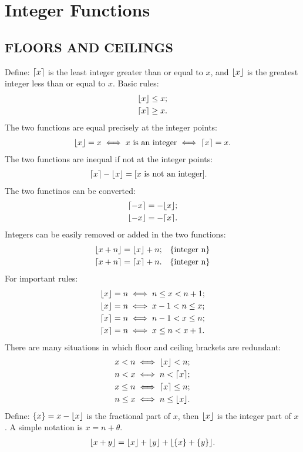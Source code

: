 \documentclass{article}
\DeclarePairedDelimiter\ceil{\lceil}{\rceil}
\DeclarePairedDelimiter\floor{\lfloor}{\rfloor}
\begin{document}
\setcounter{section}{2}
\section{Integer Functions}
\subsection{FLOORS AND CEILINGS}
Define: $\ceil{x}$ is the least integer greater than or equal to $x$, and $\floor{x}$ is the greatest integer less than or equal to $x$.
Basic rules:
\begin{align}
\floor{x} &\le x; \\
\ceil{x} &\ge x.
\end{align}
The two functions are equal precisely at the integer points:
\begin{align}
\floor{x} = x \iff x \text{ is an integer} \iff \ceil{x} = x.
\end{align}
The two functions are inequal if not at the integer points:
\begin{align}
\ceil{x} - \floor{x} &= [x \text{ is not an integer}].
\end{align}
The two functinos can be converted:
\begin{align}
\ceil{-x} &= -\floor{x}; \\
\floor{-x} &= -\ceil{x}.
\end{align}
Integers can be easily removed or added in the two functions:
\begin{align}
\floor{x + n} &= \floor{x} + n; && \{\text{integer n}\} \\
\ceil{x + n} &= \ceil{x} + n. && \{\text{integer n}\}
\end{align}
For important rules:
\begin{align}
\floor{x} = n &\iff n \le x < n+1;\\
\floor{x} = n &\iff x-1 < n \le x;\\
\ceil{x} = n &\iff n-1 < x \le n;\\
\ceil{x} = n &\iff x \le n < x + 1.
\end{align}
There are many situations in which floor and ceiling brackets are redundant:
\begin{align}
x < n &\iff \floor{x} < n;\\
n < x &\iff n < \ceil{x};\\
x \le n &\iff \ceil{x} \le n;\\
n \le x &\iff n \le \floor{x}.
\end{align}
Define: $\{x\} = x - \floor{x}$ is the fractional part of $x$, then $\floor{x}$ is the integer part of $x$.
A simple notation is $x = n + \theta$.
\begin{align}
\floor{x + y} = \floor{x} + \floor{y} + \floor{\{x\} + \{y\}}.
\end{align}
\end{document}

